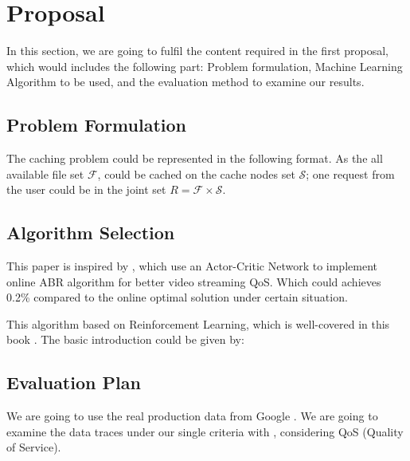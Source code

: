 \documentclass{article}
\begin{document}




\section{Proposal}
  In this section, we are going to fulfil the content required in the first proposal, which would includes the following part: Problem formulation, Machine Learning Algorithm to be used, and the evaluation method to examine our results.

  \subsection{Problem Formulation}
  The caching problem could be represented in the following format.
  As the all available file set $\mathcal{F}$, could be cached on the cache nodes set $\mathcal{S}$; one request from the user could be in the joint set $R = \mathcal{F} \times \mathcal{S}$.

  \subsection{Algorithm Selection}
    This paper is inspired by \cite{Pensieve}, which use an Actor-Critic Network to implement online ABR algorithm for better video streaming QoS.
    Which could achieves 0.2\% compared to the online optimal solution under certain situation.

    This algorithm based on Reinforcement Learning, which is well-covered in this book \cite{rl-intro}.
    The basic introduction could be given by:

  \subsection{Evaluation Plan}
  We are going to use the real production data from Google \cite{clusterdata:Reiss2011}.
  We are going to examine the data traces under our single criteria with , considering QoS (Quality of Service).




\end{document}

